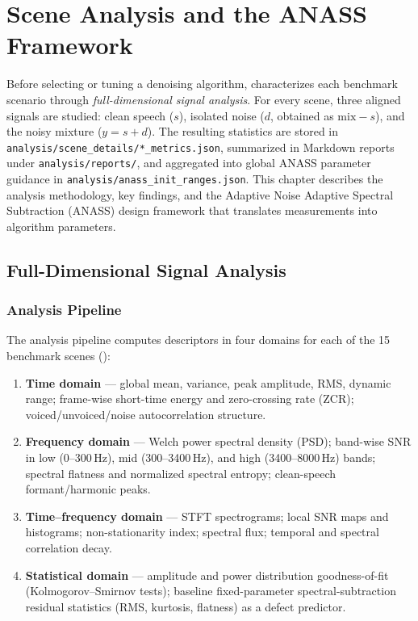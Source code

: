 \chapter{Scene Analysis and the ANASS Framework}
\label{ch:scene}

Before selecting or tuning a denoising algorithm, \projectshort{} characterizes each benchmark scenario through \emph{full-dimensional signal analysis}. For every scene, three aligned signals are studied: clean speech ($s$), isolated noise ($d$, obtained as $\mathrm{mix}-s$), and the noisy mixture ($y=s+d$). The resulting statistics are stored in \texttt{analysis/scene\_details/*\_metrics.json}, summarized in Markdown reports under \texttt{analysis/reports/}, and aggregated into global ANASS parameter guidance in \texttt{analysis/anass\_init\_ranges.json}. This chapter describes the analysis methodology, key findings, and the Adaptive Noise Adaptive Spectral Subtraction (ANASS) design framework that translates measurements into algorithm parameters.

\section{Full-Dimensional Signal Analysis}
\label{sec:full_dim_analysis}

\subsection{Analysis Pipeline}

The analysis pipeline computes descriptors in four domains for each of the 15 benchmark scenes ():

\begin{enumerate}
  \item \textbf{Time domain} --- global mean, variance, peak amplitude, RMS, dynamic range; frame-wise short-time energy and zero-crossing rate (ZCR); voiced/unvoiced/noise autocorrelation structure.
  \item \textbf{Frequency domain} --- Welch power spectral density (PSD); band-wise SNR in low (0--300\,Hz), mid (300--3400\,Hz), and high (3400--8000\,Hz) bands; spectral flatness and normalized spectral entropy; clean-speech formant/harmonic peaks.
  \item \textbf{Time--frequency domain} --- STFT spectrograms; local SNR maps and histograms; non-stationarity index; spectral flux; temporal and spectral correlation decay.
  \item \textbf{Statistical domain} --- amplitude and power distribution goodness-of-fit (Kolmogorov--Smirnov tests); baseline fixed-parameter spectral-subtraction residual statistics (RMS, kurtosis, flatness) as a defect predictor.
\end{enumerate}

